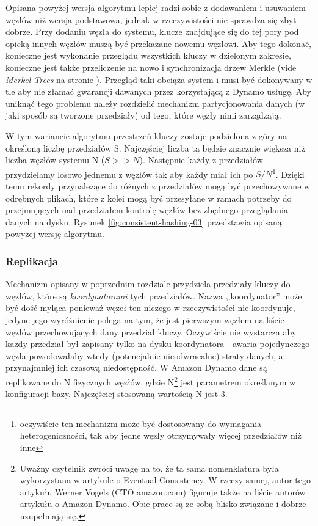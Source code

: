 
Opisana powyżej wersja algorytmu lepiej radzi sobie z dodawaniem i usuwaniem węzłów niż wersja podstawowa, jednak w rzeczywistości nie sprawdza się zbyt dobrze.
Przy dodaniu węzła do systemu, klucze znajdujące się do tej pory pod opieką innych węzłów muszą być przekazane nowemu węzłowi.
Aby tego dokonać, konieczne jest wykonanie przeglądu wszystkich kluczy w dzielonym zakresie, konieczne jest także przeliczenie na nowo i synchronizacja drzew Merkle (vide \emph{Merkel Trees} na stronie \pageref{merkle-trees}). 
Przegląd taki obciąża system i musi być dokonywany w tle aby nie złamać gwarancji dawanych przez korzystającą z Dynamo usługę.
Aby uniknąć tego problemu należy rozdzielić mechanizm partycjonowania danych (w jaki sposób są tworzone przedziały) od tego, które węzły nimi zarządzają.

W tym wariancie algorytmu przestrzeń kluczy zostaje podzielona z góry na określoną liczbę przedziałów S.
Najczęściej liczba ta będzie znacznie większa niż liczba węzłów systemu N ($S >> N$).
Następnie każdy z przedziałów przydzielamy losowo jednemu z węzłów tak aby każdy miał ich po $S/N$\footnote{oczywiście ten mechanizm może być dostosowany do wymagania heterogeniczności, tak aby jedne węzły otrzymywały więcej przedziałów niż inne}.
Dzięki temu rekordy przynależące do różnych z przedziałów mogą być przechowywane w odrębnych plikach, które z kolei mogą być przesyłane w ramach potrzeby do przejmujących nad przedziałem kontrolę węzłów bez zbędnego przeglądania danych na dysku.
Rysunek \ref{fig:consistent-hashing-03} przedstawia opisaną powyżej wersję algorytmu.


\subsubsection*{Replikacja}

Mechanizm opisany w poprzednim rozdziale przydziela przedziały kluczy do węzłów, które są \emph{koordynatorami} tych przedziałów.
Nazwa ,,koordynator'' może być dość myląca ponieważ węzeł ten niczego w rzeczywistości nie koordynuje, jedyne jego wyróżnienie polega na tym, że jest pierwszym węzłem na liście węzłów przechowujących dany przedział kluczy.
Oczywiście nie wystarcza aby każdy przedział był zapisany tylko na dysku koordynatora - awaria pojedynczego węzła powodowałaby wtedy (potencjalnie nieodwracalne) straty danych, a przynajmniej ich czasową niedostępność.
W Amazon Dynamo dane są replikowane do N fizycznych węzłów, gdzie N\footnote{
Uważny czytelnik zwróci uwagę na to, że ta sama nomenklatura była wykorzystana w artykule o Eventual Consistency.
W rzeczy samej, autor tego artykułu Werner Vogels (CTO amazon.com) figuruje także na liście autorów artykułu o Amazon Dynamo.
Obie prace są ze sobą blisko związane i dobrze uzupełniają się.
}
jest parametrem określanym w konfiguracji bazy.
Najczęściej stosowaną wartością N jest 3.

